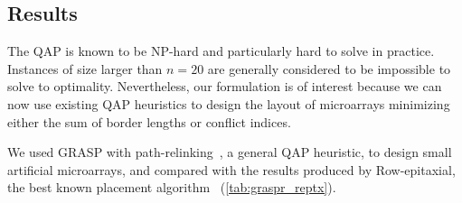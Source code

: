 \documentclass[portrait]{a0poster}
\begin{document}
\begin{multicols}{3}[\aggiheader]

\section*{\textcolor{aggigreen}{Results}}

\noindent The QAP is known to be NP-hard and particularly hard to solve in
practice. Instances of size larger than $n = 20$ are generally considered to be
impossible to solve to optimality. Nevertheless, our formulation is of interest
because we can now use existing QAP heuristics to design the layout of
microarrays minimizing either the sum of border lengths or conflict indices.

\noindent We used GRASP with path-relinking~\cite{OLIVEIRA04}, a general QAP
heuristic, to design small artificial microarrays, and compared with the
results produced by Row-epitaxial, the best known placement
algorithm~\cite{CARVALHO06} (\ref{tab:graspr_reptx}).


\end{multicols}
\end{document}

